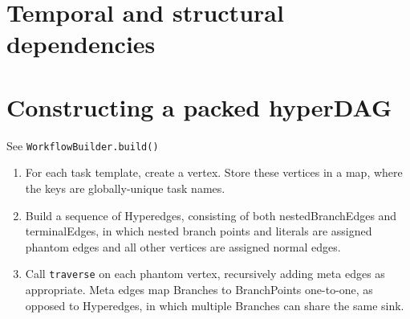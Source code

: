 \documentclass{report}
\begin{document}


\section{Temporal and structural dependencies}

\section{Constructing a packed hyperDAG}

See \texttt{WorkflowBuilder.build()}

\begin{enumerate}

\item For each task template, create a vertex. Store these vertices in a map, where the keys are globally-unique task names.

\item Build a sequence of Hyperedges, consisting of both nestedBranchEdges and terminalEdges, in which nested branch points and
      literals are assigned phantom edges and all other vertices are assigned normal edges.

\item Call \texttt{traverse} on each phantom vertex, recursively adding meta edges as appropriate. Meta edges map Branches to 
      BranchPoints one-to-one, as opposed to Hyperedges, in which multiple Branches can share the same sink.

\end{enumerate}




\end{document}
